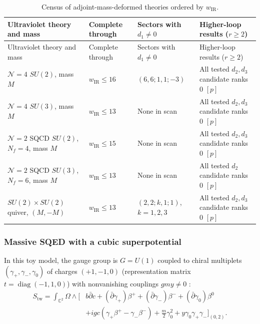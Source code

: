 \documentclass[11pt]{article}
\numberwithin{equation}{section}
\numberwithin{figure}{section}
\numberwithin{table}{section}
\begin{document}
{\footnotesize\renewcommand{\arraystretch}{1.26}\setlength{\tabcolsep}{3.5pt}
\begin{xltabular}{\linewidth}{|>{\raggedright\arraybackslash}X|l|>{\raggedright\arraybackslash}p{3.2cm}|>{\raggedright\arraybackslash}X|}
\caption{Census of adjoint-mass-deformed theories ordered by $w_{\mathrm{IR}}$.}\label{local-ch9-mass-census}\\
\hline
Ultraviolet theory and mass & Complete through & Sectors with $d_1\ne0$ & Higher-loop results ($r\ge2$)\\
\hline\endfirsthead
\hline
Ultraviolet theory and mass & Complete through & Sectors with $d_1\ne0$ & Higher-loop results ($r\ge2$)\\
\hline\endhead
$\mathcal N=4$ $SU(2)$, mass $M$ & $w_{\mathrm{IR}}\le16$ & $(6,6;1,1;-3)$ & All tested $d_2,d_3$ candidate ranks $0$ $[p]$\\
\hline
$\mathcal N=4$ $SU(3)$, mass $M$ & $w_{\mathrm{IR}}\le13$ & None in scan & All tested $d_2,d_3$ candidate ranks $0$ $[p]$\\
\hline
$\mathcal N=2$ SQCD $SU(2)$, $N_f=4$, mass $M$ & $w_{\mathrm{IR}}\le15$ & None in scan & All tested $d_2,d_3$ candidate ranks $0$ $[p]$\\
\hline
$\mathcal N=2$ SQCD $SU(3)$, $N_f=6$, mass $M$ & $w_{\mathrm{IR}}\le13$ & None in scan & All tested $d_2$ candidate ranks $0$ $[p]$\\
\hline
$SU(2)\times SU(2)$ quiver, $(M,-M)$ & $w_{\mathrm{IR}}\le13$ & $(2,2;k,1;1)$, $k=1,2,3$ & All tested $d_2,d_3$ candidate ranks $0$ $[p]$\\
\hline
\end{xltabular}}

\subsubsection{Massive SQED with a cubic superpotential}\label{sec-results-SQED}

In this toy model, the gauge group is $G=U(1)$ coupled to chiral multiplets $(\gamma_+,\gamma_-,\gamma_0)$ of charges $(+1,-1,0)$ (representation matrix $t=\operatorname{diag}(-1,1,0)$) with nonvanishing couplings $gmy\ne0$ \cite[results report, \S5.4]{Repo}:
\begin{equation}\label{local-ch9-sqed-action}
\begin{aligned}
S_{\mathrm{tw}}=\int_{\mathbb C^2}\Omega\wedge\Big[
&b\bar\partial c
+(\bar\partial\gamma_+)\beta^+
+(\bar\partial\gamma_-)\beta^-
+(\bar\partial\gamma_0)\beta^0\\
&+igc(\gamma_+\beta^+-\gamma_-\beta^-)
+\frac m2\gamma_0^2+y\gamma_0\gamma_+\gamma_-\Big]_{(0,2)}.
\end{aligned}
\end{equation}
\end{document}
